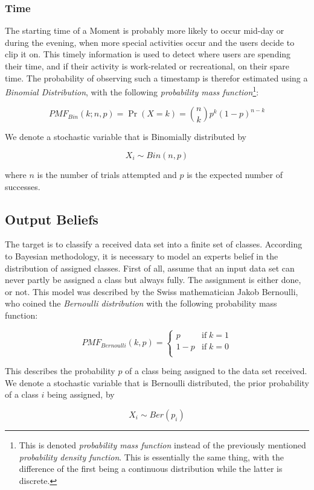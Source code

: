 \subsubsection{Time}
The starting time of a Moment is probably more likely to occur mid-day or 
during the evening, when more special activities occur and the users decide 
to clip it on. This timely information is used to detect where users are 
spending their time, and if their activity is work-related or recreational, 
on their spare time. The probability of observing such a timestamp is therefor 
estimated using a \emph{Binomial Distribution}, with the following
\emph{probability mass function}\footnote{
    This is denoted \emph{probability mass function} instead of the 
    previously mentioned \emph{probability density function}. This is 
    essentially the same thing, with the difference of the first being
    a continuous distribution while the latter is discrete. }:
\begin{definition}
\label{definition:binomial-pmf}
$$
    PMF_{Bin}(k;n, p) = \Pr(X = k) = {n\choose k}p^k(1-p)^{n-k}
$$
\end{definition}

We denote a stochastic variable that is Binomially distributed by
\begin{definition}
\label{definition:binomial-variable}
$$
    X_i \sim Bin(n, p)
$$
\end{definition}
where $n$ is the number of trials attempted and $p$ is the expected
number of successes.

\subsection{Output Beliefs}
The target is to classify a received data set into a finite set of classes. 
According to Bayesian methodology, it is necessary to model an experts 
belief in the distribution of assigned classes. First of all, assume that 
an input data set can never partly be assigned a class but always fully. 
The assignment is either done, or not. This model was described by the 
Swiss mathematician Jakob Bernoulli, who coined the 
\emph{Bernoulli distribution} with the following probability mass function:
\begin{definition}
\label{definition:bernoulli-pmf}
$$
    PMF_{Bernoulli}(k,p) =
    \begin{cases} 
        p   & \mathrm{if} \; k = 1 \\
        1-p & \mathrm{if} \; k = 0 \\
    \end{cases}
$$
\end{definition}
This describes the probability $p$ of a class being assigned to the data 
set received. We denote a stochastic variable that is Bernoulli 
distributed, the prior probability of a class $i$ being assigned, by
\begin{definition}
\label{definition:bernoulli-variable}
$$
    X_i \sim Ber(p_i)
$$
\end{definition}

